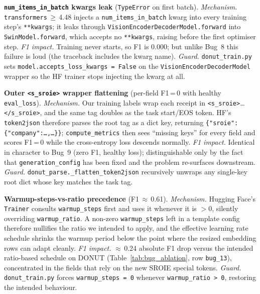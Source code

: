 \item \textbf{\texttt{num\_items\_in\_batch} kwargs leak}
  (\texttt{TypeError} on first batch).
  \textit{Mechanism.} \texttt{transformers}\,$\geq$\,4.48 injects a
  \texttt{num\_items\_in\_batch} kwarg into every training step's
  \texttt{**kwargs}; it leaks through
  \texttt{VisionEncoderDecoderModel.forward} into
  \texttt{SwinModel.forward}, which accepts no \texttt{**kwargs},
  raising before the first optimiser step.  \textit{F1 impact.}
  Training never starts, so F1 is 0.000; but unlike Bug~8 this
  failure is loud (the traceback includes the kwarg name).
  \textit{Guard.} \texttt{donut\_train.py} sets
  \texttt{model.accepts\_loss\_kwargs = False} on the
  \texttt{VisionEncoderDecoderModel} wrapper so the HF trainer stops
  injecting the kwarg at all.

\item \textbf{Outer \texttt{<s\_sroie>} wrapper flattening}
  (per-field F1\,=\,0 with healthy \texttt{eval\_loss}).
  \textit{Mechanism.} Our training labels wrap each receipt in
  \texttt{<s\_sroie>}\ldots\texttt{</s\_sroie>}, and the same tag
  doubles as the task start/EOS token.  HF's \texttt{token2json}
  therefore parses the root tag as a dict key, returning
  \texttt{\{"sroie":\{"company":\ldots,\ldots\}\}};
  \texttt{compute\_metrics} then sees ``missing keys'' for every
  field and scores F1\,=\,0 while the cross-entropy loss descends
  normally.  \textit{F1 impact.} Identical in character to Bug~9
  (zero F1, healthy loss); distinguishable only by the fact that
  \texttt{generation\_config} has been fixed and the problem
  re-surfaces downstream.  \textit{Guard.}
  \texttt{donut\_parse.\_flatten\_token2json} recursively unwraps
  any single-key root dict whose key matches the task tag.

\item \textbf{Warmup-steps-vs-ratio precedence} (F1\,$\approx$\,0.61).
  \textit{Mechanism.} Hugging Face's \texttt{Trainer} consults
  \texttt{warmup\_steps} first and uses it whenever it is $>$0,
  silently overriding \texttt{warmup\_ratio}.  A non-zero
  \texttt{warmup\_steps} left in a template config therefore
  nullifies the ratio we intended to apply, and the effective
  learning rate schedule shrinks the warmup period below the point
  where the resized embedding rows can adapt cleanly.
  \textit{F1 impact.} $\approx$\,0.24 absolute F1 drop versus the
  intended ratio-based schedule on DONUT (Table~\ref{tab:bug_ablation},
  row \texttt{bug\_13}), concentrated in the
  fields that rely on the new SROIE special tokens.
  \textit{Guard.} \texttt{donut\_train.py} forces
  \texttt{warmup\_steps\,=\,0} whenever
  \texttt{warmup\_ratio\,>\,0}, restoring the intended behaviour.
